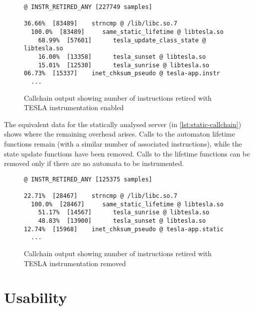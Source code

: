 \begin{figure}
  \begin{verbatim}
@ INSTR_RETIRED_ANY [227749 samples]

36.66%  [83489]    strncmp @ /lib/libc.so.7
  100.0%  [83489]     same_static_lifetime @ libtesla.so
    68.99%  [57601]      tesla_update_class_state @ libtesla.so
    16.00%  [13358]      tesla_sunset @ libtesla.so
    15.01%  [12530]      tesla_sunrise @ libtesla.so
06.73%  [15337]    inet_chksum_pseudo @ tesla-app.instr
  ...
  \end{verbatim}
  \caption{Callchain output showing number of instructions retired with
  TESLA instrumentation enabled}
  \label{lst:instr-callchain}
\end{figure}

The equivalent data for the statically analysed server (in
\autoref{lst:static-callchain}) shows where the remaining overhead arises. Calls
to the automaton lifetime functions remain (with a similar number of associated
instructions), while the state update functions have been removed. Calls to the
lifetime functions can be removed only if there are no automata to be
instrumented.

\begin{figure}
  \begin{verbatim}
@ INSTR_RETIRED_ANY [125375 samples]

22.71%  [28467]    strncmp @ /lib/libc.so.7
  100.0%  [28467]     same_static_lifetime @ libtesla.so
    51.17%  [14567]      tesla_sunrise @ libtesla.so
    48.83%  [13900]      tesla_sunset @ libtesla.so
12.74%  [15968]    inet_chksum_pseudo @ tesla-app.static
  ...
  \end{verbatim}
  \caption{Callchain output showing number of instructions retired with
  TESLA instrumentation removed}
  \label{lst:static-callchain}
\end{figure}

\section{Usability}

